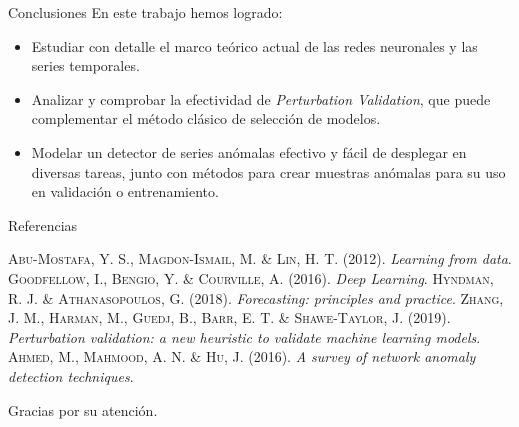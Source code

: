 \documentclass[spanish]{beamer}
\begin{document}
\begin{frame}{Conclusiones}
  En este trabajo hemos logrado:
  \pause
  \begin{itemize}[<+->]
    \item Estudiar con detalle el marco teórico actual de las redes neuronales y las series temporales.
    \item Analizar y comprobar la efectividad de \emph{Perturbation Validation}, que puede complementar el método clásico de selección de modelos.
    \item Modelar un detector de series anómalas efectivo y fácil de desplegar en diversas tareas, junto con métodos para crear muestras anómalas para su uso en validación o entrenamiento.
  \end{itemize}
\end{frame}

\begin{frame}{Referencias}
  \begin{thebibliography}{9}
     \textsc{Abu-Mostafa, Y. S., Magdon-Ismail, M. \& Lin, H. T}. (2012). \textit{Learning from data}.
     \textsc{Goodfellow, I., Bengio, Y. \& Courville, A}. (2016). \textit{Deep Learning}.
     \textsc{Hyndman, R. J. \& Athanasopoulos, G}. (2018). \textit{Forecasting: principles and practice}.
     \textsc{Zhang, J. M., Harman, M., Guedj, B., Barr, E. T. \& Shawe-Taylor, J}. (2019). \textit{Perturbation validation: a new heuristic to validate machine learning models}.
     \textsc{Ahmed, M., Mahmood, A. N. \& Hu, J}. (2016). \textit{A survey of network anomaly detection techniques}.
  \end{thebibliography}
\end{frame}

\begin{frame}[standout]
  Gracias por su atención.
\end{frame}
\end{document}
